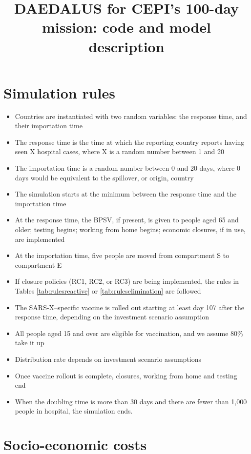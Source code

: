 \documentclass[
]{article}
\title{DAEDALUS for CEPI's 100-day mission: code and model description}
\author{}
\date{\vspace{-2.5em}}
\providecommand{\tightlist}{%
  \setlength{\itemsep}{0pt}\setlength{\parskip}{0pt}}
\begin{document}
\maketitle

\section{Simulation rules}\label{simulation-rules}

\begin{itemize}
\tightlist
\item
  Countries are instantiated with two random variables: the response time, and their importation time
\item
  The response time is the time at which the reporting country reports having seen X hospital cases, where X is a random number between 1 and 20
\item
  The importation time is a random number between 0 and 20 days, where 0 days would be equivalent to the spillover, or origin, country
\item
  The simulation starts at the minimum between the response time and the importation time
\item
  At the response time, the BPSV, if present, is given to people aged 65 and older; testing begins; working from home begins; economic closures, if in use, are implemented
\item
  At the importation time, five people are moved from compartment S to compartment E
\item
  If closure policies (RC1, RC2, or RC3) are being implemented, the rules in Tables \ref{tab:rulesreactive} or \ref{tab:ruleselimination} are followed
\item
  The SARS-X--specific vaccine is rolled out starting at least day 107 after the response time, depending on the investment scenario assumption
\item
  All people aged 15 and over are eligible for vaccination, and we assume 80\% take it up
\item
  Distribution rate depends on investment scenario assumptions
\item
  Once vaccine rollout is complete, closures, working from home and testing end
\item
  When the doubling time is more than 30 days and there are fewer than 1,000 people in hospital, the simulation ends.
\end{itemize}

\section{Socio-economic costs}\label{socio-economic-costs}
\end{document}
